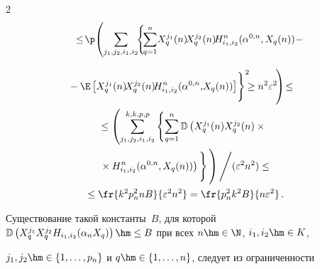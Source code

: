 \begin{multicols}{2}
\begin{multline*}
{}\leq\!


\p\!\left(\sum\limits_{j_1,j_2,i_1,i_2}\!\!\left\{


\!\sum\limits_{q=1}^n\!X_q^{j_1}(n)\!X_q^{j_2}(n)\!H^n_{i_1,i_2}


(\alpha^{0,n}, X_q(n))\!-{}\right.\right.\hspace*{-12.14558pt}


\end{multline*}





\noindent


\begin{multline}


\hspace*{-3pt}\!\!\!\left.\left.{}-\E\left[X_q^{j_1}(n)\!X_q^{j_2}(n)\!H^n_{i_1,i_2}(\alpha^{0,n},\! X_q(n))


\right]\! \vphantom{\sum\limits_{q=1}^n}\right\}^2\!\!\!


\geq n^2 \varepsilon^2\!\right)\!\leq{}\hspace*{-0.7565pt}\\


{}\leq \left( \sum\limits_{j_1,j_2,i_1,i_2}^{k,k,p,p}\left\{


\sum\limits_{q=1}^n\mathbb{D}\left(X_q^{j_1}(n)X_q^{j_2}(n)\times{}\right.\right.\right.\\


\left.\left.\left.{}\times


H^n_{i_1,i_2}(\alpha^{0,n}, X_q(n))


\right) 


\vphantom{\sum\limits_{q=1}^n}\right\}


\vphantom{\sum\limits_{j_1,j_2,i_1,i_2}^{k,k,p,p}}\right)\Bigg / (\varepsilon^2n^2)


\leq{}\\


{}\leq\fr{k^2p_n^2nB}{\varepsilon^2n^2}=\fr{p_n^2k^2B}{n\varepsilon^2}\,.


\label{eq171}


\end{multline}





Существование такой константы~$B$, для которой $\mathbb{D}\left(X_q^{j_1}X_q^{j_2}H_{i_1,i_2}


(\alpha_{n} X_q)\right)\hm\leq B$ при всех $n\hm\in \N$, $i_1,i_2\hm\in K$, 


$j_1,j_2\hm\in\{1,\ldots,p_n\}$ и $q\hm\in\{1,\ldots,n\}$, следует из ограниченности 



\end{multicols}
